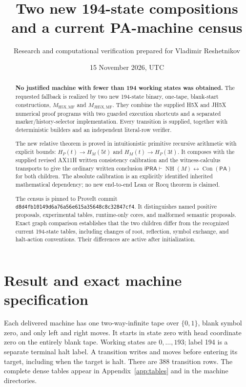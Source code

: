 \documentclass[11pt,letterpaper]{article}
\title{Two new 194-state compositions\\and a current PA-machine census}
\author{Research and computational verification prepared for Vladimir Reshetnikov}
\date{15 November 2026, UTC}
\newcommand{\ipra}{\mathsf{iPRA}}
\newcommand{\PA}{\mathsf{PA}}
\newcommand{\Con}{\operatorname{Con}}
\newcommand{\NH}{\operatorname{NH}}
\newcommand{\file}[1]{\texttt{\nolinkurl{#1}}}
\newcommand{\Mone}{\ensuremath{M_{\mathrm{H5X,MF}}}}
\newcommand{\Mtwo}{\ensuremath{M_{\mathrm{JH5X,MF}}}}
\begin{document}
\maketitle
\begin{abstract}
\textbf{No justified machine with fewer than 194 working states was obtained.}
The requested fallback is realized by two new 194-state binary, one-tape,
blank-start constructions, \Mone{} and \Mtwo. They combine the supplied
H5X and JH5X numerical proof programs with two guarded execution shortcuts
and a separated marker/history-selector implementation. Every transition
is supplied, together with deterministic builders and an independent
literal-row verifier.

The new relative theorem is proved in intuitionistic primitive recursive
arithmetic with explicit bounds:
$H_P(t)\to H_M(5t)$ and $H_M(t)\to H_P(3t)$.
It composes with the supplied revised AX11H written consistency calibration
and the witness-calculus transports to give the ordinary written conclusion
$\ipra\vdash\NH(M)\leftrightarrow\Con(\PA)$ for both children.
The absolute calibration is an explicitly identified inherited mathematical
dependency; no new end-to-end Lean or Rocq theorem is claimed.

The census is pinned to ProveIt commit
\file{d8d4fb10149d6a76a56e615a35648c8c32847cf4}.
It distinguishes named positive proposals, experimental tables, runtime-only
cores, and malformed semantic proposals. Exact graph comparison establishes
that the two children differ from the recognized current 194-state tables,
including changes of root, reflection, symbol exchange, and halt-action
conventions. Their differences are active after initialization.
\end{abstract}
\clearpage
\tableofcontents
\clearpage

\section{Result and exact machine specification}
\label{sec:result}
Each delivered machine has one two-way-infinite tape over $\{0,1\}$,
blank symbol zero, and only left and right moves. It starts in state zero
with head coordinate zero on the entirely blank tape. Working states are
$0,\ldots,193$; label 194 is a separate terminal halt label. A transition
writes and moves before entering its target, including when the target is
halt. There are 388 transition rows. The complete dense tables appear in
Appendix~\ref{app:tables} and in the machine directories.
\end{document}
